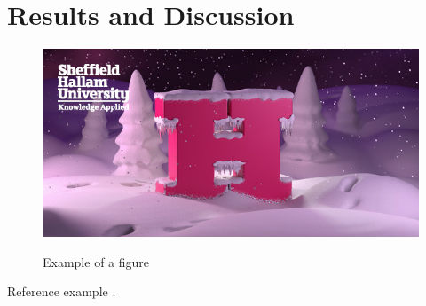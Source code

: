 \chapter{Results and Discussion}

\begin{figure}[!htb]
    \caption{Example of a figure}
    \centering 
    \includegraphics[scale=0.5]{images/img.png}
    \label{figure:img}
\end{figure}


Reference example \cite{Abreu:2010}.